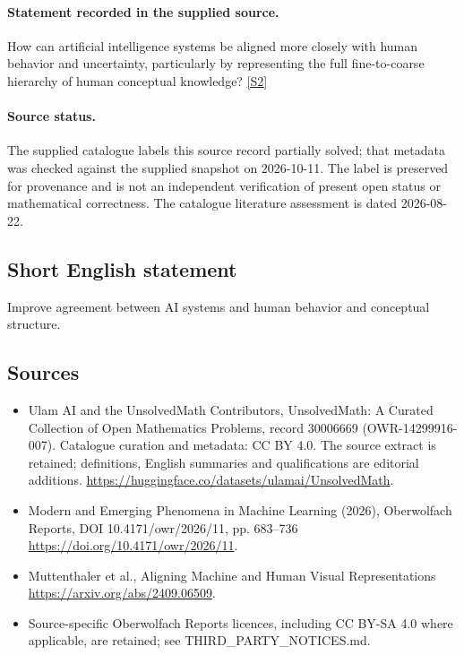 \documentclass[11pt]{article}
\begin{document}
\paragraph{Statement recorded in the supplied source.}
How can artificial intelligence systems be aligned more closely with human behavior and uncertainty, particularly by representing the full fine-to-coarse hierarchy of human conceptual knowledge? \href{https://doi.org/10.4171/owr/2026/11}{[S2]}
\paragraph{Source status.}
The supplied catalogue labels this source record partially solved; that metadata was checked against the supplied snapshot on 2026-10-11. The label is preserved for provenance and is not an independent verification of present open status or mathematical correctness. The catalogue literature assessment is dated 2026-08-22.
\subsection{Short English statement}
Improve agreement between AI systems and human behavior and conceptual structure.
\subsection{Sources}
\begin{itemize}
\item[S1] Ulam AI and the UnsolvedMath Contributors, UnsolvedMath: A Curated Collection of Open Mathematics Problems, record 30006669 (OWR-14299916-007). Catalogue curation and metadata: CC BY 4.0. The source extract is retained; definitions, English summaries and qualifications are editorial additions.
\url{https://huggingface.co/datasets/ulamai/UnsolvedMath}.
\item[S2] Modern and Emerging Phenomena in Machine Learning (2026), Oberwolfach Reports, DOI 10.4171/owr/2026/11, pp. 683--736
\url{https://doi.org/10.4171/owr/2026/11}.
\item[S3] Muttenthaler et al., Aligning Machine and Human Visual Representations
\url{https://arxiv.org/abs/2409.06509}.
\item Source-specific Oberwolfach Reports licences, including CC BY-SA 4.0 where applicable, are retained; see THIRD\_PARTY\_NOTICES.md.
\end{itemize}
\end{document}
